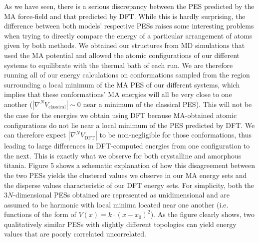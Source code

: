 \documentclass[aps,prb,twocolumn,amsmath,amssymb,superscriptaddress,longbibliography]{revtex4-1}
\newcommand\tab[1][1cm]{\hspace*{#1}} %
\begin{document}
\tab As we have seen, there is a serious discrepancy between the PES predicted by the MA force-field and that predicted by DFT.
While this is hardly surprising, the difference between both models' respective PESs raises some interesting problems when trying to directly compare the energy of a particular arrangement of atoms given by both methods. 
We obtained our structures from MD simulations that used the MA potential and allowed the atomic configurations of our different systems to equilibrate with the thermal bath of each run.
We are therefore running all of our energy calculations on conformations sampled from the region surrounding a local minimum of the MA PES of our different systems, which implies that these conformations' MA energies will all be very close to one another ($|\nabla^N V_{\text{classical}}|\sim 0$ near a minimum of the classical PES).
This will not be the case for the energies we obtain using DFT because MA-obtained atomic configurations do not lie near a local minimum of the PES predicted by DFT.
We can therefore expect $|\nabla^N V_{\text{DFT}}|$ to be non-negligible for those conformations, thus leading to large differences in DFT-computed energies from one configuration to the next.
This is exactly what we observe for both crystalline and amorphous titania.
Figure 5 shows a schematic explanation of how this disagreement between the two PESs yields the clustered values we observe in our MA energy sets and the disperse values characteristic of our DFT energy sets.
For simplicity, both the $3N$-dimensional PESs obtained are represented as unidimensional and are assumed to be harmonic with local minima located near one another (i.e. functions of the form of $V(x) = k\cdot (x-x_0)^2$).
As the figure clearly shows, two qualitatively similar PESs with slightly different topologies can yield energy values that are poorly correlated uncorrelated.
\end{document}
